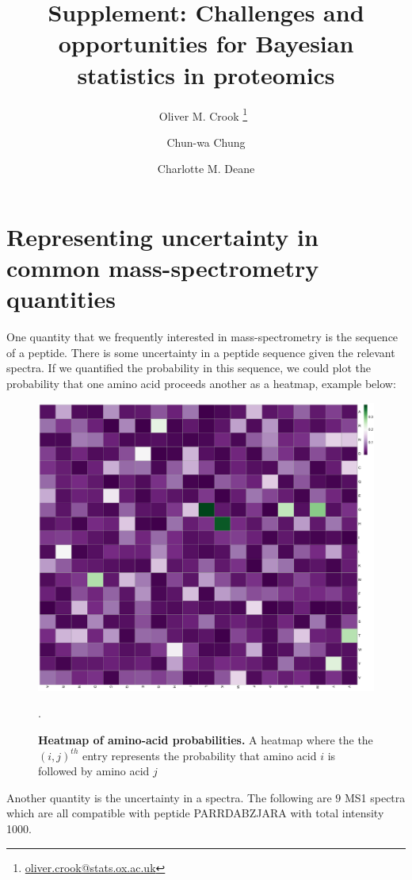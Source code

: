 \documentclass[12pt,english, journal=jpr, layout=twocolumn]{article}
\title{Supplement: Challenges and opportunities for Bayesian statistics in proteomics}
\author[1]{Oliver M. Crook \thanks{\url{oliver.crook@stats.ox.ac.uk}}~}
\author[2]{Chun-wa Chung}
\author[1]{Charlotte M. Deane}
\begin{document}
	
\section{Representing uncertainty in common mass-spectrometry quantities}
One quantity that we frequently interested in mass-spectrometry is the sequence of a peptide. There is some uncertainty in a peptide sequence given the relevant spectra. If we quantified the probability in this sequence, we could plot the probability that one amino acid proceeds another as a heatmap, example below:

\begin{figure}[H]
	\centering
	\includegraphics[width =1\textwidth]{probabilityaminoacids.pdf}
	\caption{\textbf{Heatmap of amino-acid probabilities.} A heatmap where the the $(i,j)^{th}$ entry represents the probability that amino acid $i$ is followed by amino acid $j$}.
	\label{figure::figure1aa}
\end{figure}

Another quantity is the uncertainty in a spectra. The following are $9$ MS1 spectra which are all compatible with peptide PARRDABZJARA with total intensity 1000.
	
\end{document}
